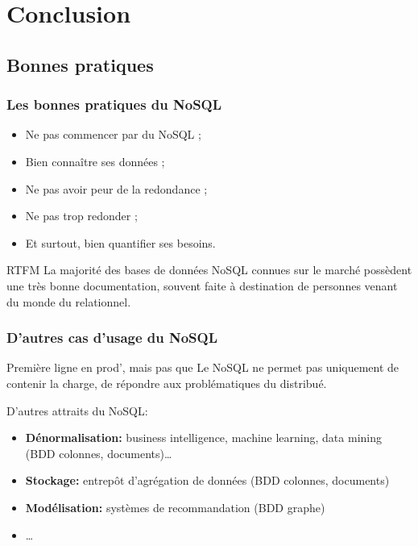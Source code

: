 \section{Conclusion}

    \subsection{Bonnes pratiques}
        \begin{frame}
            \frametitle{Les bonnes pratiques du NoSQL}

            \begin{itemize}
                \item Ne pas commencer par du NoSQL ;
                \item Bien connaître ses données ;
                \item Ne pas avoir peur de la redondance ;
                \item Ne pas trop redonder ;
                \item Et surtout, bien quantifier ses besoins.
            \end{itemize}


            \begin{block}{RTFM}
                La majorité des bases de données NoSQL connues sur le marché possèdent une très bonne documentation, souvent faite à destination de personnes venant du monde du relationnel.
            \end{block}
        \end{frame}

        \begin{frame}
            \frametitle{D'autres cas d'usage du NoSQL}
            \begin{alertblock}{Première ligne en prod', mais pas que}
                Le NoSQL ne permet pas uniquement de contenir la charge, de répondre aux problématiques du distribué.
            \end{alertblock}

            \vspace{10px}

            D'autres attraits du NoSQL:
            \begin{itemize}
                \item \textbf{Dénormalisation:} business intelligence, machine learning, data mining (BDD colonnes, documents)\dots
                \item \textbf{Stockage:} entrepôt d’agrégation de données (BDD colonnes, documents)
                \item \textbf{Modélisation:} systèmes de recommandation (BDD graphe)
                \item \dots
            \end{itemize}
        \end{frame}

